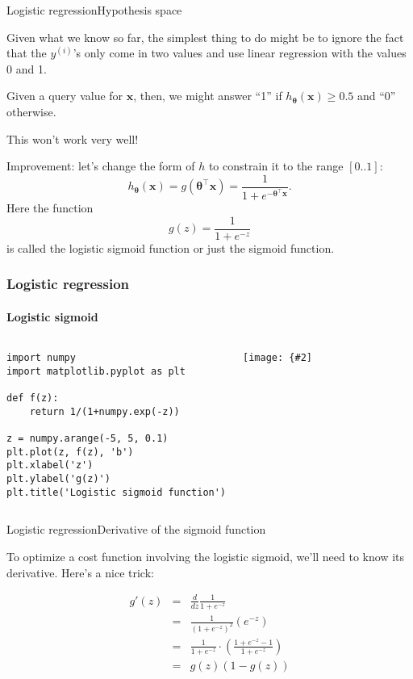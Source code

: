 \documentclass{beamer}
\renewcommand{\vec}[1]{\boldsymbol{#1}}
\newcommand{\myfig}[3]{\centerline{\texttt{[image: \{\#2]}}}
    \centerline{\scriptsize #3}}
\begin{document}
\begin{frame}{Logistic regression}{Hypothesis space}

  Given what we know so far, the simplest thing to do might be to
  ignore the fact that the $y^{(i)}$'s only come in two values and use
  linear regression with the values 0 and 1.

  \medskip

  Given a query value for $\vec{x}$, then, we might answer ``1'' if
  $h_{\vec{\theta}}(\vec{x}) \ge 0.5$ and ``0'' otherwise.
  
  \medskip

  This won't work very well!

  \medskip

  Improvement: let's change the form of $h$ to constrain
  it to the range $[0..1]$:
  \[ h_{\vec{\theta}}(\vec{x}) = g(\vec{\theta}^\top \vec{x}) = \frac{1}{1+e^{-\vec{\theta}^\top \vec{x}}}. \]
  Here the function
  \[ g(z) = \frac{1}{1 + e^{-z}} \]
  is called the \alert{logistic sigmoid function} or just the
  \alert{sigmoid function}.

\end{frame}


\begin{frame}[fragile]
  \frametitle{Logistic regression}
  \framesubtitle{Logistic sigmoid}

 \begin{columns}

 \column{2in}

\begin{tiny}
\begin{lstlisting}
import numpy
import matplotlib.pyplot as plt

def f(z):
    return 1/(1+numpy.exp(-z))

z = numpy.arange(-5, 5, 0.1)
plt.plot(z, f(z), 'b')
plt.xlabel('z')
plt.ylabel('g(z)')
plt.title('Logistic sigmoid function')
\end{lstlisting}
\end{tiny}

\column{2in}

\myfig{2.5in}{logistic}{}
  
  \end{columns}

\end{frame}


\begin{frame}{Logistic regression}{Derivative of the sigmoid function}

  To optimize a cost function involving the logistic sigmoid, we'll
  need to know its derivative. Here's a nice trick:

  \begin{eqnarray}
    g'(z) & = & \frac{d}{dz} \frac{1}{1+e^{-z}} \nonumber \\
    & = & \frac{1}{(1+e^{-z})^2}(e^{-z}) \nonumber \\
    & = & \frac{1}{1+e^{-z}} \cdot \left(\frac{1+e^{-z}-1}{1+e^{-z}}\right) \nonumber \\
    & = & g(z)(1-g(z)) \nonumber
  \end{eqnarray}
  
\end{frame}
\end{document}
